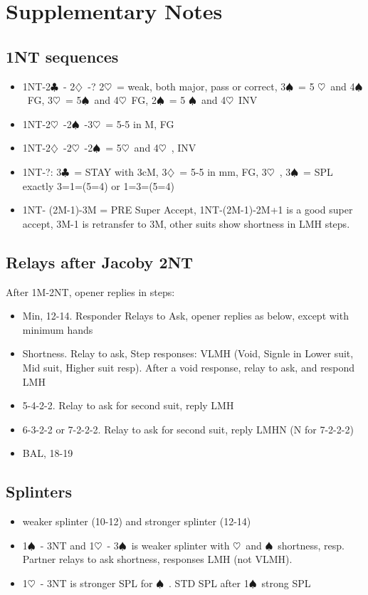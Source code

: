 \documentclass{article}
\newcommand\C{\ensuremath{\clubsuit}}
\newcommand\D{\ensuremath{\diamondsuit}}
\renewcommand\H{\ensuremath{\heartsuit}}
\renewcommand\S{\ensuremath{\spadesuit}}
\begin{document}
\section{Supplementary Notes}
\begin{multicols}{2}
  \subsection{1NT sequences}
  \label{1ntfollowups}
  \begin{itemize}
    \item 1NT-2\C\ - 2\D\ -?  2\H\ = weak, both major, pass or correct, 3\S\ = 5 \H\ and 4\S\ FG, 3\H\ = 5\S\ and 4\H\ FG, 2\S\ = 5 \S\ and 4\H\ INV
    \item 1NT-2\H\ -2\S\ -3\H\ = 5-5 in M, FG
    \item 1NT-2\D\ -2\H\ -2\S\ = 5\H\ and 4\H\ , INV
    \item 1NT-?: 3\C\ = STAY with 3cM, 3\D\ = 5-5 in mm, FG, 3\H\ , 3\S\ = SPL exactly 3=1=(5=4) or 1=3=(5=4)
    \item 1NT- (2M-1)-3M = PRE Super Accept, 1NT-(2M-1)-2M+1 is a good super accept, 3M-1 is retransfer to 3M, other suits show shortness in LMH steps.
  \end{itemize}
  



  \subsection{Relays after Jacoby 2NT}
  \label{j2nt}
  After 1M-2NT, opener replies in steps:
  \begin{itemize}
    \item Min, 12-14. Responder Relays to Ask, opener replies as below, except with minimum hands
    \item Shortness. Relay to ask, Step responses:  VLMH (Void, Signle in Lower suit, Mid suit, Higher suit resp). After a void response, relay to ask, and respond LMH
    \item 5-4-2-2. Relay to ask for second suit, reply LMH
    \item 6-3-2-2 or 7-2-2-2. Relay to ask for second suit, reply LMHN (N for 7-2-2-2)
    \item BAL, 18-19
  \end{itemize}
  \subsection{Splinters}
  \label{spl}
   \begin{itemize}
     \item weaker splinter (10-12) and stronger splinter (12-14)
     \item 1\S\ - 3NT and 1\H\ - 3\S\ is weaker splinter with \H\ and \S\ shortness, resp. Partner relays to ask shortness, responses LMH (not VLMH).
     \item 1\H\ - 3NT is stronger SPL for \S\ . STD SPL after 1\S\ strong SPL  
   \end{itemize}

\end{multicols}
\end{document}
